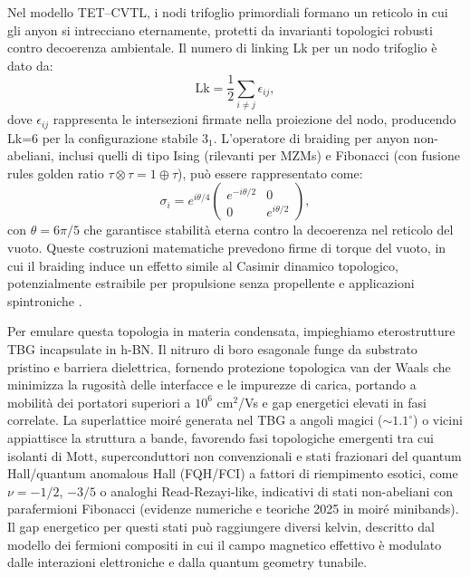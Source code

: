 \documentclass[11pt,a4paper]{article}
\let\oldcite\cite
\renewcommand{\cite}{\protect\oldcite}
\theoremstyle{plain}
\theoremstyle{definition}
\begin{document}
Nel modello TET--CVTL, i nodi trifoglio primordiali formano un reticolo in cui gli anyon si intrecciano eternamente, protetti da invarianti topologici robusti contro decoerenza ambientale. Il numero di linking Lk per un nodo trifoglio è dato da:
\begin{equation}
\mathrm{Lk} = \frac{1}{2} \sum_{i \neq j} \epsilon_{ij},
\end{equation}
dove $\epsilon_{ij}$ rappresenta le intersezioni firmate nella proiezione del nodo, producendo Lk=6 per la configurazione stabile 3$_1$. L'operatore di braiding per anyon non-abeliani, inclusi quelli di tipo Ising (rilevanti per MZMs) e Fibonacci (con fusione rules golden ratio $\tau \otimes \tau = 1 \oplus \tau$), può essere rappresentato come:
\begin{equation}
\sigma_i = e^{i \theta / 4} \begin{pmatrix}
e^{-i \theta / 2} & 0 \\
0 & e^{i \theta / 2}
\end{pmatrix},
\end{equation}
con $\theta = 6\pi/5$ che garantisce stabilità eterna contro la decoerenza nel reticolo del vuoto. Queste costruzioni matematiche prevedono firme di torque del vuoto, in cui il braiding induce un effetto simile al Casimir dinamico topologico, potenzialmente estraibile per propulsione senza propellente e applicazioni spintroniche \cite{PhysSoliman2026Vacuum}.

Per emulare questa topologia in materia condensata, impieghiamo eterostrutture TBG incapsulate in h-BN. Il nitruro di boro esagonale funge da substrato pristino e barriera dielettrica, fornendo protezione topologica van der Waals che minimizza la rugosità delle interfacce e le impurezze di carica, portando a mobilità dei portatori superiori a $10^6$ cm$^2$/Vs e gap energetici elevati in fasi correlate. La superlattice moiré generata nel TBG a angoli magici ($\sim 1.1^\circ$) o vicini appiattisce la struttura a bande, favorendo fasi topologiche emergenti tra cui isolanti di Mott, superconduttori non convenzionali e stati frazionari del quantum Hall/quantum anomalous Hall (FQH/FCI) a fattori di riempimento esotici, come $\nu = -1/2$, $-3/5$ o analoghi Read-Rezayi-like, indicativi di stati non-abeliani con parafermioni Fibonacci (evidenze numeriche e teoriche 2025 in moiré minibands). Il gap energetico per questi stati può raggiungere diversi kelvin, descritto dal modello dei fermioni compositi in cui il campo magnetico effettivo è modulato dalle interazioni elettroniche e dalla quantum geometry tunabile.
\end{document}
